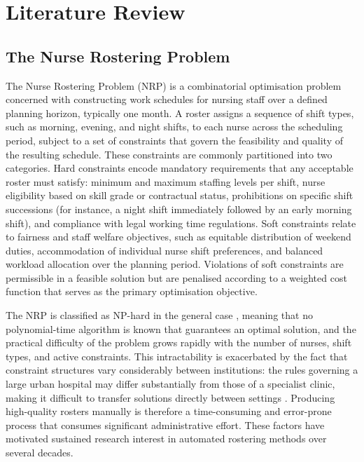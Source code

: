 \documentclass[12pt, a4paper, oneside]{report}
\begin{document}
\chapter{Literature Review}
\label{ch:literature}

\section{The Nurse Rostering Problem}
\label{sec:nrp}

The Nurse Rostering Problem (NRP) is a combinatorial optimisation
problem concerned with constructing work schedules for nursing staff
over a defined planning horizon, typically one month. A roster assigns
a sequence of shift types, such as morning, evening, and night
shifts, to each nurse across the scheduling period, subject to a set
of constraints that govern the feasibility and quality of the
resulting schedule. These constraints are commonly partitioned into
two categories. Hard constraints encode mandatory requirements that
any acceptable roster must satisfy: minimum and maximum staffing
levels per shift, nurse eligibility based on skill grade or
contractual status, prohibitions on specific shift successions (for
instance, a night shift immediately followed by an early morning
shift), and compliance with legal working time regulations. Soft
constraints relate to fairness and staff
welfare objectives, such as equitable distribution of weekend duties,
accommodation of individual nurse shift preferences, and balanced
workload allocation over the planning period. Violations of soft
constraints are permissible in a feasible solution but are penalised
according to a weighted cost function that serves as the primary
optimisation objective.

The NRP is classified as NP-hard in the general case
\citet{Haspeslagh2014, Awadallah2015}, meaning that no
polynomial-time algorithm is known that guarantees an optimal
solution, and the practical difficulty of the problem grows rapidly
with the number of nurses, shift types, and active constraints. This
intractability is exacerbated by the fact that constraint structures
vary considerably between institutions: the rules governing a large
urban hospital may differ substantially from those of a specialist
clinic, making it difficult to transfer solutions directly between
settings \citet{Cheng1997}. Producing high-quality rosters manually
is therefore a time-consuming and error-prone process that consumes
significant administrative effort. These factors have motivated
sustained research interest in automated rostering methods over
several decades.
\end{document}
